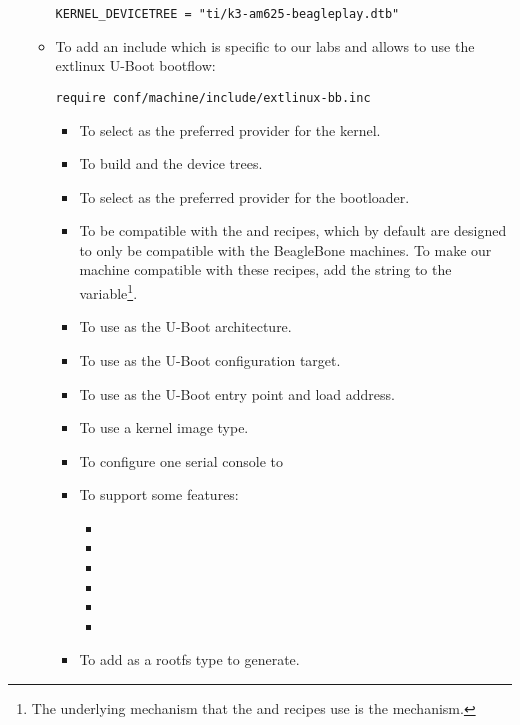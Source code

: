 \begin{itemize}
\begin{itemize}
\begin{verbatim}
KERNEL_DEVICETREE = "ti/k3-am625-beagleplay.dtb"
\end{verbatim}
  \item To add an include which is specific to our labs
  and allows to use the extlinux U-Boot bootflow:
\begin{verbatim}
require conf/machine/include/extlinux-bb.inc
\end{verbatim}
  \else
\begin{itemize}
  \item To select  as the preferred provider
    for the kernel.
  \item To build  and the
     device trees.
  \item To select  as the preferred provider
    for the bootloader.
  \item To be compatible with the  and 
    recipes, which by default are designed to only be compatible with the
    BeagleBone machines. To make our  machine compatible with
    these recipes, add the string  to the
     variable\footnote{The underlying mechanism that the
     and  recipes use is the
     mechanism.}.
  \item To use  as the U-Boot architecture.
  \item To use  as the U-Boot
    configuration target.
  \item To use  as the U-Boot entry point and load
    address.
  \item To use a  kernel image type.
  \item To configure one serial console to 
  \item To support some features:
    \begin{itemize}
      \item {}
      \item {}
      \item {}
      \item {}
      \item {}
      \item {}
    \end{itemize}
  \item To add  as a rootfs type to generate.
  \fi
\fi
\end{itemize}


\end{itemize}
\end{itemize}
